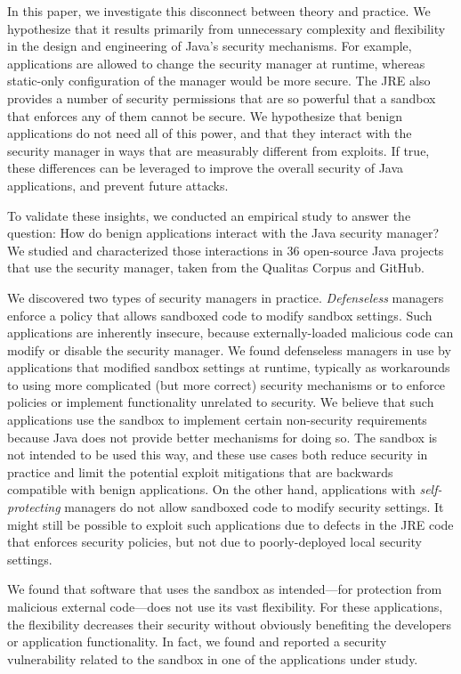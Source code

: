 \documentclass{sig-alternate}
\begin{document}
In this paper, we investigate this disconnect between theory and practice. We
hypothesize that it results primarily from unnecessary complexity and flexibility
in the design and engineering of Java's security mechanisms. For example,
applications are allowed to change the security manager at runtime, whereas
static-only configuration of the manager would be more secure. The JRE also
provides a number of security permissions that are so powerful that a sandbox
that enforces any of them cannot be secure. We
hypothesize that benign applications do not need all of this power, and that
they interact with the security manager in ways
that are measurably different from exploits.
If true, these differences can be leveraged to improve the overall security of
Java applications, and prevent future attacks.


To validate these insights, we conducted an empirical study
to answer the question: How do benign
applications interact with the Java security manager? We studied and
characterized those interactions in 36
open-source Java projects that use the security manager, taken from the Qualitas
Corpus \cite{QualitasCorpus:APSEC:2010} and GitHub.


We discovered two types of security managers in
practice. \emph{Defenseless} managers enforce a policy that allows sandboxed code
to modify sandbox settings. Such applications
are inherently insecure, because externally-loaded malicious code can
modify or disable the security manager. We found defenseless managers in use
by applications that modified sandbox settings at runtime, typically
as workarounds to using more complicated (but more correct) security mechanisms
or to enforce policies or implement functionality
unrelated to security. We believe that such applications use the
sandbox to implement certain non-security requirements
because Java does not provide better mechanisms for doing so.
The sandbox is not intended to be used this way, and these use cases
both reduce security in practice and limit the potential exploit mitigations that are
backwards compatible with benign applications.
On the other hand, applications with \emph{self-protecting} managers do
not allow sandboxed code to modify security settings.
It might still be possible to exploit
such applications due to defects in the JRE code that enforces security
policies, but not due to poorly-deployed local security settings.


We found that
software that uses the sandbox as intended---for protection from malicious external code---does not use its
vast flexibility. For these applications, the flexibility decreases their security without
obviously benefiting the developers or application functionality. In fact, we found and reported a
security vulnerability related to the sandbox in one of the applications under study.
\end{document}
